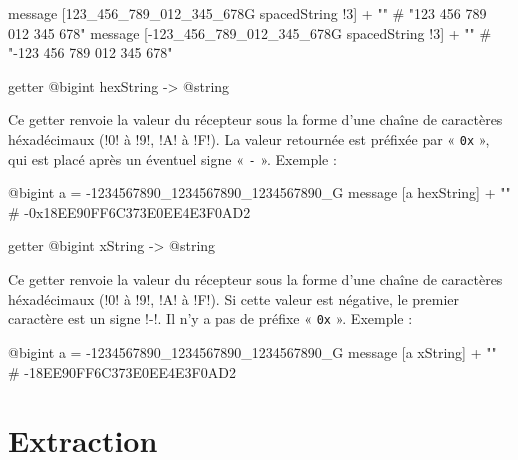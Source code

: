 \begin{galgas}
message [123_456_789_012_345_678G spacedString !3] + "\n" # "123 456 789 012 345 678"
message [-123_456_789_012_345_678G spacedString !3] + "\n" # "-123 456 789 012 345 678"
\end{galgas}






\begin{galgas}
getter @bigint hexString -> @string
\end{galgas}

Ce getter renvoie la valeur du récepteur sous la forme d'une chaîne de caractères héxadécimaux (\ggs!0! à \ggs!9!, \ggs!A! à \ggs!F!). La valeur retournée est préfixée par « \texttt{0x} », qui est placé après un éventuel signe « \texttt{-} ». Exemple :

\begin{galgas}
@bigint a = -1234567890_1234567890_1234567890_G
message [a hexString] + "\n" # -0x18EE90FF6C373E0EE4E3F0AD2
\end{galgas}









\begin{galgas}
getter @bigint xString -> @string
\end{galgas}

Ce getter renvoie la valeur du récepteur sous la forme d'une chaîne de caractères héxadécimaux (\ggs!0! à \ggs!9!, \ggs!A! à \ggs!F!). Si cette valeur est négative, le premier caractère est un signe \ggs!-!. Il n'y a pas de préfixe « \texttt{0x} ». Exemple :

\begin{galgas}
@bigint a = -1234567890_1234567890_1234567890_G
message [a xString] + "\n" # -18EE90FF6C373E0EE4E3F0AD2
\end{galgas}









\section{Extraction}

